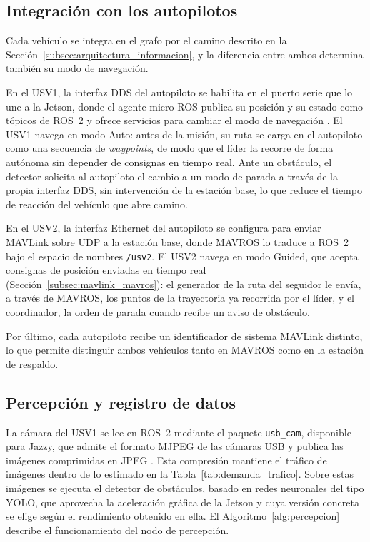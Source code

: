  
\subsection{Integración con los autopilotos}
\label{subsec:integracion_autopilotos}
 
Cada vehículo se integra en el grafo por el camino descrito en la Sección~\ref{subsec:arquitectura_informacion}, y la 
diferencia entre ambos determina también su modo de navegación.
 
En el USV1, la interfaz DDS del autopiloto se habilita en el puerto serie que lo une a la Jetson, donde el agente 
micro-ROS publica su posición y su estado como tópicos de ROS~2 y ofrece servicios para cambiar el modo de navegación 
\cite{albatati2026}. El USV1 navega en modo Auto: antes de la misión, su ruta se carga en el autopiloto como una 
secuencia de \textit{waypoints}, de modo que el líder la recorre de forma autónoma sin depender de consignas en 
tiempo real. Ante un obstáculo, el detector solicita al autopiloto el cambio a un modo de parada a través de la propia 
interfaz DDS, sin intervención de la estación base, lo que reduce el tiempo de reacción del vehículo que abre camino.
 
En el USV2, la interfaz Ethernet del autopiloto se configura para enviar MAVLink sobre UDP a la estación base, donde 
MAVROS lo traduce a ROS~2 bajo el espacio de nombres \texttt{/usv2}. El USV2 navega en modo Guided, que acepta consignas 
de posición enviadas en tiempo real (Sección~\ref{subsec:mavlink_mavros}): el generador de la ruta del seguidor le 
envía, a través de MAVROS, los puntos de la trayectoria ya recorrida por el líder, y el coordinador, la orden de parada 
cuando recibe un aviso de obstáculo.
 
Por último, cada autopiloto recibe un identificador de sistema MAVLink distinto, lo que permite distinguir ambos 
vehículos tanto en MAVROS como en la estación de respaldo.
 
\subsection{Percepción y registro de datos}
\label{subsec:percepcion_registro}
 
La cámara del USV1 se lee en ROS~2 mediante el paquete \texttt{usb\_cam}, disponible para Jazzy, que 
admite el formato MJPEG de las cámaras USB y publica las imágenes comprimidas en JPEG \cite{usb_cam}. Esta 
compresión mantiene el tráfico de imágenes dentro de lo estimado en la Tabla~\ref{tab:demanda_trafico}. 
Sobre estas imágenes se ejecuta el detector de obstáculos, basado en redes neuronales del tipo YOLO, que 
aprovecha la aceleración gráfica de la Jetson y cuya versión concreta se elige según el rendimiento obtenido 
en ella. El Algoritmo~\ref{alg:percepcion} describe el funcionamiento del nodo de percepción.
 
